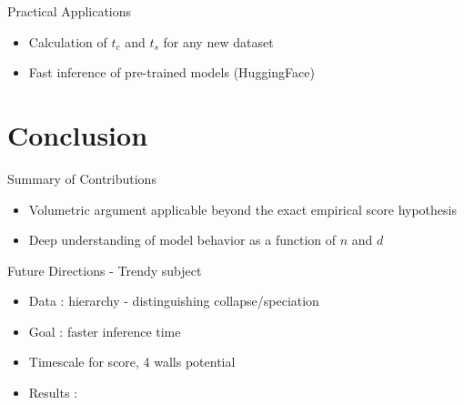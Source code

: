 \documentclass[aspectratio=169]{beamer}
\begin{document}
\begin{frame}{Practical Applications}
    \begin{itemize}
        \item Calculation of $t_c$ and $t_s$ for any new dataset
        \item Fast inference of pre-trained models (HuggingFace)
    \end{itemize}
\end{frame}

\section{Conclusion}
\begin{frame}{Summary of Contributions}
    \begin{itemize}
        \item Volumetric argument applicable beyond the exact empirical score hypothesis
        \item Deep understanding of model behavior as a function of $n$ and $d$
    \end{itemize}
\end{frame}


\begin{frame}{Future Directions - Trendy subject}
    \begin{itemize}
        \item Data : hierarchy - distinguishing collapse/speciation
        \item Goal : faster inference time
        \item Timescale for score, 4 walls potential
        \item Results : 
    \end{itemize}
    
    \begin{center}
    \end{center}
\end{frame}
\end{document}
